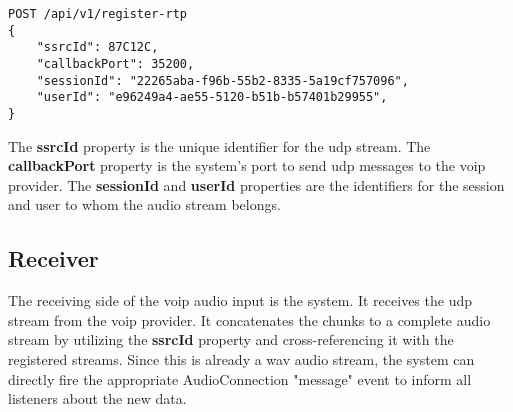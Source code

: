 \begin{verbatim}
POST /api/v1/register-rtp
{
    "ssrcId": 87C12C,
    "callbackPort": 35200,
    "sessionId": "22265aba-f96b-55b2-8335-5a19cf757096",
    "userId": "e96249a4-ae55-5120-b51b-b57401b29955",
}
\end{verbatim}

The \textbf{ssrcId} property is the unique identifier for the \ac{udp} stream. The \textbf{callbackPort} property is 
the system's port to send \ac{udp} messages to the \ac{voip} provider. The \textbf{sessionId} and \textbf{userId} 
properties are the identifiers for the session and user to whom the audio stream belongs.

\subsection{Receiver}

The receiving side of the \ac{voip} audio input is the system. It receives the \ac{udp} stream from the \ac{voip} 
provider. It concatenates the chunks to a complete audio stream by utilizing the \textbf{ssrcId} property and 
cross-referencing it with the registered streams. Since this is already a \ac{wav} audio stream, the system can directly 
fire the appropriate AudioConnection "message" event to inform all listeners about the new data.
